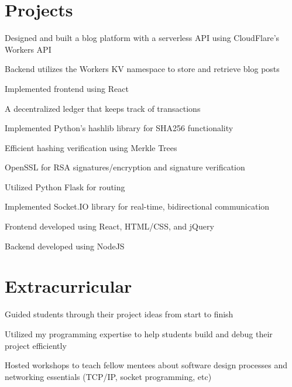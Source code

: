 \documentclass[]{deedy-resume-openfont}
\begin{document}
\begin{minipage}[t]{0.66\textwidth}
\section{Projects}
\descript{|}
\vspace{\topsep} %
\begin{tightemize}
\item Designed and built a blog platform with a serverless API using CloudFlare's Workers API
\item Backend utilizes the Workers KV namespace to store and retrieve blog posts
\item Implemented frontend using React
\end{tightemize}
\sectionsep
{}
\descript{|}
\vspace{\topsep} %
\begin{tightemize}
\item A decentralized ledger that keeps track of transactions
\item Implemented Python's hashlib library for SHA256 functionality
\item Efficient hashing verification using Merkle Trees
\item OpenSSL for RSA signatures/encryption and signature verification
\item Utilized Python Flask for routing
\end{tightemize}
\sectionsep
{}
\descript{|}
\vspace{\topsep} %
\begin{tightemize}
\item Implemented Socket.IO library for real-time, bidirectional communication
\item Frontend developed using React, HTML/CSS, and jQuery
\item Backend developed using NodeJS
\end{tightemize}
\sectionsep
\section{Extracurricular} 

\vspace{\topsep} %
\begin{tightemize}
\item Guided students through their project ideas from start to finish
\item Utilized my programming expertise to help students build and debug their project efficiently
\item Hosted workshops to teach fellow mentees about software design processes and networking essentials (TCP/IP, socket programming, etc)
\end{tightemize}

\end{minipage} 
\end{document}
